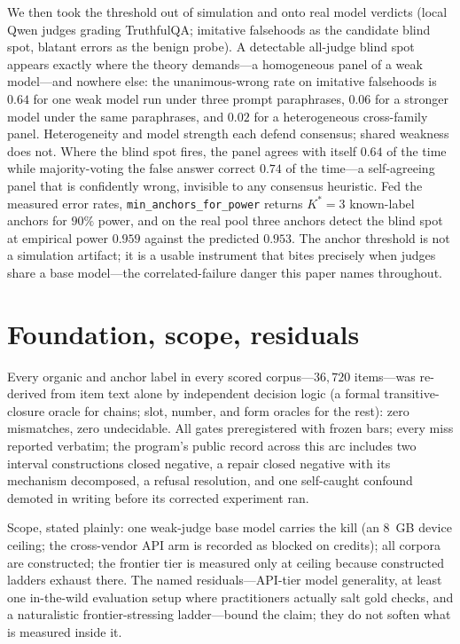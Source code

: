 \documentclass[11pt]{article}
\begin{document}
We then took the threshold out of simulation and onto real model verdicts (local Qwen judges grading
TruthfulQA; imitative falsehoods as the candidate blind spot, blatant errors as the benign probe). A
detectable all-judge blind spot appears exactly where the theory demands---a homogeneous panel of a weak
model---and nowhere else: the unanimous-wrong rate on imitative falsehoods is $0.64$ for one weak model
run under three prompt paraphrases, $0.06$ for a stronger model under the same paraphrases, and $0.02$
for a heterogeneous cross-family panel. Heterogeneity and model strength each defend consensus; shared
weakness does not. Where the blind spot fires, the panel agrees with itself $0.64$ of the time while
majority-voting the false answer correct $0.74$ of the time---a self-agreeing panel that is confidently
wrong, invisible to any consensus heuristic. Fed the measured error rates,
\texttt{min\_anchors\_for\_power} returns $K^{*}{=}3$ known-label anchors for $90\%$ power, and on the
real pool three anchors detect the blind spot at empirical power $0.959$ against the predicted $0.953$.
The anchor threshold is not a simulation artifact; it is a usable instrument that bites precisely when
judges share a base model---the correlated-failure danger this paper names throughout.

\section{Foundation, scope, residuals}

Every organic and anchor label in every scored corpus---$36{,}720$ items---was re-derived from item
text alone by independent decision logic (a formal transitive-closure oracle for chains; slot, number,
and form oracles for the rest): zero mismatches, zero undecidable. All gates preregistered with frozen
bars; every miss reported verbatim; the program's public record across this arc includes two interval
constructions closed negative, a repair closed negative with its mechanism decomposed, a refusal
resolution, and one self-caught confound demoted in writing before its corrected experiment ran.

Scope, stated plainly: one weak-judge base model carries the kill (an 8~GB device ceiling; the
cross-vendor API arm is recorded as blocked on credits); all corpora are constructed; the frontier tier
is measured only at ceiling because constructed ladders exhaust there. The named residuals---API-tier
model generality, at least one in-the-wild evaluation setup where practitioners actually salt gold
checks, and a naturalistic frontier-stressing ladder---bound the claim; they do not soften what is
measured inside it.
\end{document}

